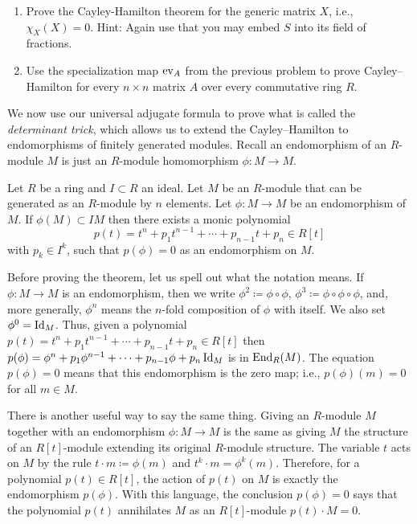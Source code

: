 \documentclass[Notebook.tex]{subfiles}
\begin{document}
\begin{enumerate}[leftmargin=*, resume=problems]
\begin{enumerate}
    \item Prove the Cayley-Hamilton theorem for the generic matrix $X$, i.e., $\chi_{X}(X)=0$. Hint: Again use that you may embed $S$ into its field of fractions. 
    \item Use the specialization map $\operatorname{ev}_A$  from the previous problem to prove Cayley--Hamilton for every $n\times n$ matrix $A$ over every commutative ring $R$.
\end{enumerate}
\end{enumerate}

\hrulefill

We now use our universal adjugate formula to prove what is called the \emph{determinant trick}, which allows us to extend the Cayley--Hamilton to endomorphisms of finitely generated modules. Recall an endomorphism of an $R$-module $M$ is just an $R$-module homomorphism $\phi:M \to M$. 

\begin{theorem}
	Let $R$ be a ring and $I\subset R$ an ideal.  Let $M$ be an $R$-module that can be generated as an $R$-module by $n$ elements. Let $\phi:M\to M$ be an endomorphism of $M$. If $\phi(M) \subset IM$ then there exists a monic polynomial
	\[
	p(t) = t^{n} + p_{1}t^{n-1}+\cdots+p_{n-1}t+p_{n} \in R[t]
	\]
	with $p_{k} \in I^{k}$, such that $p(\phi)=0$ as an endomorphism on $M$. 
\end{theorem}


Before proving the theorem, let us spell out what the notation means. If $\phi:M\to M$ is an endomorphism, then we write $\phi^{2}\coloneqq \phi\circ \phi$, $\phi^{3}\coloneqq \phi\circ\phi\circ\phi$, and, more generally, $\phi^n$ means the $n$-fold composition of $\phi$ with itself. We also set $\phi^0=\operatorname{Id}_M$. Thus, given a polynomial $p(t)=t^{n} + p_{1}t^{n-1}+\cdots+p_{n-1}t+p_{n}\in R[t]$ then $p(\phi)=\phi^{n} + p_{1}\phi^{n-1}+\cdots+p_{n-1}\phi+p_{n}\operatorname{Id}_{M}$ is in $\operatorname{End}_{R}(M)$. The equation $p(\phi)=0$ means that this endomorphism is the zero map; i.e., $p(\phi)(m)=0$ for all $m\in M$. 

There is another useful way to say the same thing. Giving an $R$-module $M$ together with an endomorphism $\phi:M\to M$ is the same as giving $M$ the structure of an $R[t]$-module extending its original $R$-module structure. The variable $t$ acts on $M$ by the rule $t\cdot m \coloneqq \phi(m)$ and $t^k\cdot m=\phi^k(m)$. Therefore, for a polynomial $p(t)\in R[t]$, the action of $p(t)$ on $M$ is exactly the endomorphism $p(\phi)$. With this language, the conclusion $p(\phi)=0$ says that the polynomial $p(t)$ annihilates $M$ as an $R[t]$-module $p(t)\cdot M=0$. 
\end{document}

